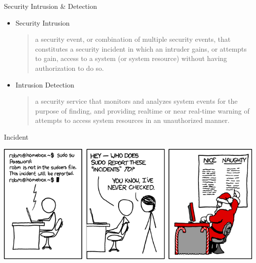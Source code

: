 \documentclass{beamer}
\begin{document}
\begin{frame}{Security Intrusion \& Detection}
  \begin{itemize}
  \item Security Intrusion 
    \begin{quote}
a security event, or combination of multiple security 
events, that constitutes a security incident in which an 
intruder gains, or attempts to gain, access to a system 
(or system resource) without having authorization to do 
so. 
    \end{quote}
  \item Intrusion Detection
    
    \begin{quote}
a security service that monitors and analyzes system 
events for the purpose of finding, and providing realtime or near real-time warning of attempts to access 
system resources in an unauthorized manner.
    \end{quote}
  \end{itemize}
\end{frame}

\begin{frame}{Incident}
   \begin{center}
    \includegraphics[width=1\linewidth]{incident}
  \end{center}
\end{frame}
\end{document}
